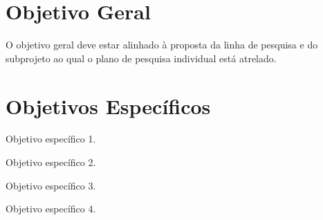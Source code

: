 
\section{Objetivo Geral}\label{sec:objetivo_geral}

O objetivo geral deve estar alinhado à proposta da linha de pesquisa e do subprojeto ao qual o plano de pesquisa individual está atrelado.


\section{Objetivos Específicos}\label{sec:objetivos_especificos}

\begin{alineas}
    \item Objetivo específico 1.
    
    \item Objetivo específico 2.
    
    \item Objetivo específico 3.
    
    \item Objetivo específico 4.
\end{alineas}
